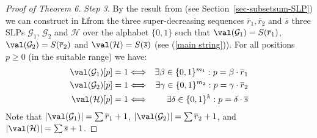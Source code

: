 \begin{proof}[Proof of Theorem 6]
\medskip
\noindent
{\em Step 3.} 
By the result from \cite{ref35} (see Section~\ref{sec-subsetsum-SLP})
we can construct in \L from the three super-decreasing sequences
$\overline{r}_1, \overline{r}_2$ and $\overline{s}$ three SLPs $\mathcal{G}_1$,   $\mathcal{G}_2$ and $\mathcal{H}$ over the alphabet
$\{0,1\}$ such that $\val(\mathcal{G}_1) = S(\overline{r}_1)$, $\val(\mathcal{G}_2) = S(\overline{r}_2)$
and $\val(\mathcal{H}) = S(\overline{s})$ (see (\ref{main string})).
For all positions $p \geq 0$ (in the suitable range) we have:
\begin{eqnarray*}
\val(\mathcal{G}_1)[p] = 1  & \Longleftrightarrow & 
\exists \beta \in  \{0,1\}^{m_1}: 
p = \beta \cdot \overline{r}_1 \\ 
\val(\mathcal{G}_2)[p] = 1  & \Longleftrightarrow & 
\exists  \gamma \in  \{0,1\}^{m_2}: 
p = \gamma \cdot \overline{r}_2 \\ 
\val(\mathcal{H})[p] = 1  & \Longleftrightarrow & 
\exists \delta \in  \{0,1\}^k: 
p = \delta \cdot \overline{s}
\end{eqnarray*}
Note that $|\val(\mathcal{G}_1)| = \sum\overline{r}_1+1$, $|\val(\mathcal{G}_2)| = \sum\overline{r}_2+1$, and
$|\val(\mathcal{H})| = \sum\overline{s}+1$.



\end{proof}
